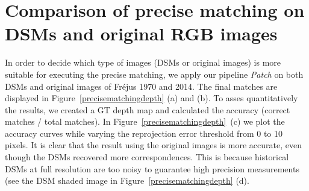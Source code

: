 
\chapter{Comparison of precise matching on DSMs and original RGB images}
\label{chap:appendix4}
In order to decide which type of images (DSMs or original images) is more suitable for executing the precise matching, we apply our pipeline \textit{Patch} on both DSMs and original images of Fr{\'e}jus 1970 and 2014.
The final matches are displayed in Figure~\ref{precisematchingdepth} (a) and (b). 
To asses quantitatively the results, we created a GT depth map and calculated the accuracy (correct matches / total matches). In Figure~\ref{precisematchingdepth}~(c) we plot the accuracy curves while varying the reprojection error threshold from 0 to 10 pixels. 
{It is clear that} the result using the original images is more accurate, even though the DSMs recovered more correspondences.
This is because historical DSMs at full resolution are too noisy to guarantee high precision measurements (see the DSM shaded image in Figure~\ref{precisematchingdepth} (d).
